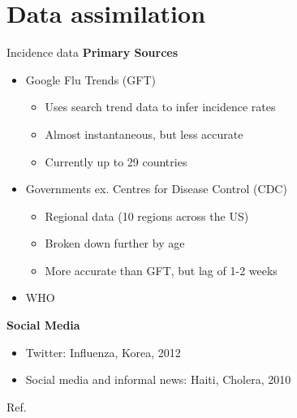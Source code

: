 \documentclass[11pt,compress,aspectratio=1610]{beamer}
\begin{document}
\section{Data assimilation}




\begin{frame}{Incidence data}
\textbf{Primary Sources}
\begin{itemize}
    \item Google Flu Trends (GFT)
    \begin{itemize}
        \item Uses search trend data to infer incidence rates
        \item Almost instantaneous, but less accurate
        \item Currently up to 29 countries
    \end{itemize}
    \item Governments ex. Centres for Disease Control (CDC)
    \begin{itemize}
        \item Regional data (10 regions across the US)
        \item Broken down further by age
        \item More accurate than GFT, but lag of 1-2 weeks
    \end{itemize}
    \item WHO
\end{itemize}
\textbf{Social Media}
\begin{itemize}
	\item Twitter: Influenza, Korea, 2012 
	\item Social media and informal news: Haiti, Cholera, 2010
\end{itemize}
\vfill{\scriptsize Ref. \cite{Cook2011}\cite{Kim2013} }
\end{frame}
\end{document}

